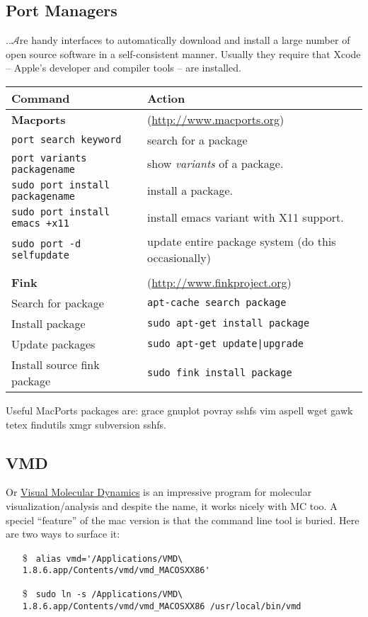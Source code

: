 \documentclass[a4paper,10pt]{article}
\begin{document}
\subsection{\label{sec:ports}Port Managers}
..$\mathcal{A}$re handy interfaces to automatically download and install a large number of open source software in a self-consistent manner. Usually they require that Xcode -- Apple's developer and compiler tools -- are installed.
\begin{table}[h!]
\center
\begin{small}
\begin{tabular}{ll}\hline\hline
Command              & Action \\\hline
\textbf{Macports}    & (\url{http://www.macports.org})\\
\verb"port search keyword" & search for a package\\
\verb+port variants packagename+ & show \emph{variants} of a package.\\
\verb"sudo port install packagename" & install a package.\\
\verb"sudo port install emacs +x11" & install emacs variant with X11 support.\\
\verb"sudo port -d selfupdate" & update entire package system (do this occasionally)\\
\\
\textbf{Fink}       & (\url{http://www.finkproject.org})\\
Search for package  & \verb"apt-cache search package"\\
Install package     & \verb"sudo apt-get install package"\\
Update packages     &  \verb"sudo apt-get update|upgrade"\\
Install source fink package & \verb"sudo fink install package"\\\hline
\end{tabular}\end{small}\end{table}

Useful MacPorts packages are: grace gnuplot povray sshfs vim aspell wget gawk tetex findutils xmgr subversion sshfs.


\subsection{VMD}
Or \href{http://www.google.com/search?q=vmd}{Visual Molecular Dynamics} is an impressive program for molecular visualization/analysis and despite the name, it works nicely with MC too. A speciel ``feature'' of the mac version is that the command line tool is buried. Here are two ways to surface it:
\begin{itemize}
\item[\$] \verb+ alias vmd='/Applications/VMD\ 1.8.6.app/Contents/vmd/vmd_MACOSXX86'+
\item[\$] \verb+ sudo ln -s /Applications/VMD\ 1.8.6.app/Contents/vmd/vmd_MACOSXX86 /usr/local/bin/vmd+\end{itemize}
\end{document}
